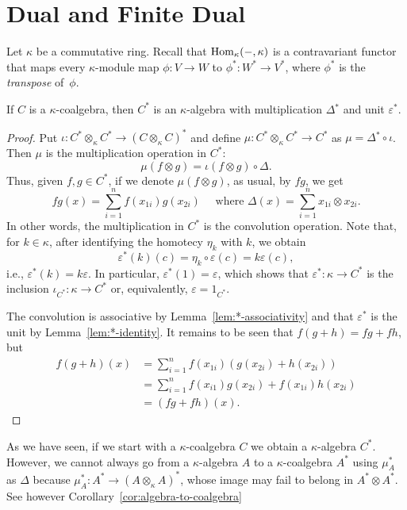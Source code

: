 \section{Dual and Finite Dual}

Let $\kappa$ be a commutative ring. Recall that ${\rm Hom}_\kappa(-,\kappa)$ is a contravariant functor that maps every $\kappa$-module map $\phi\colon V\to W$ to $\phi^*\colon W^*\to V^*$, where $\phi^*$ is the \textsl{transpose} of~$\phi$.

\begin{lem}\label{lem:dual-kappa-algebra}
    If\/ $C$ is a\/ $\kappa$-coalgebra, then\/ $C^*$ is an\/ $\kappa$-algebra with multiplication\/ $\Delta\!^*$ and unit\/ $\varepsilon^*$.
\end{lem}

\begin{proof}
    Put $\iota\colon C^*\otimes_\kappa C^*\to (C\otimes_\kappa C)^*$ and define $\mu\colon C^*\otimes_\kappa C^*\to C^*$ as $\mu = \Delta\!^*\circ\iota$. Then $\mu$ is the multiplication operation in $C^*$:
    $$
        \mu(f\otimes g) = \iota(f\otimes g)\circ\Delta.
    $$
    Thus, given $f,g\in C^*$, if we denote $\mu(f\otimes g)$, as usual, by $fg$, we get
    $$
        fg(x) = \sum_{i=1}^nf(x_{1i})g(x_{2i})\quad\text{ where }
            \Delta(x) = \sum_{i=1}^nx_{1i}\otimes x_{2i}.
    $$
    In other words, the multiplication in $C^*$ is the convolution operation. Note that, for $k\in\kappa$, after identifying the homotecy $\eta_k$ with $k$, we obtain
    $$
        \varepsilon^*(k)(c) = \eta_k\circ\varepsilon(c)
            = k\varepsilon(c),
    $$
    i.e., $\varepsilon^*(k)=k\varepsilon$. In particular, $\varepsilon^*(1)=\varepsilon$, which shows that $\varepsilon^*\colon\kappa\to C^*$ is the inclusion $\iota_{C^*}\colon\kappa\to C^*$ or, equivalently, $\varepsilon=1_{C^*}$.

    The convolution is associative by Lemma~\ref{lem:*-associativity} and that $\varepsilon^*$ is the unit by Lemma~\ref{lem:*-identity}. It remains to be seen that $f(g+h)=fg+fh$, but
    \begin{align*}
        f(g+h)(x) &= \sum_{i=1}^nf(x_{1i})(g(x_{2i})+h(x_{2i}))\\
            &= \sum_{i=1}^nf(x_{i1})g(x_{2i}) + f(x_{1i})h(x_{2i})\\
            &= (fg+fh)(x).
    \end{align*}
\end{proof}

\begin{rem}\label{rem:algebra-to-coalgebra-issue}
    As we have seen, if we start with a $\kappa$-coalgebra $C$ we obtain a $\kappa$-algebra $C^*$. However, we cannot always go from a $\kappa$-algebra $A$ to a $\kappa$-coalgebra $A^*$ using $\mu_A^*$ as $\Delta$ because $\mu_A^*\colon A^*\to(A\otimes_\kappa A)^*$, whose image may fail to belong in $A^*\otimes A^*$. See however Corollary~\ref{cor:algebra-to-coalgebra}
\end{rem}

